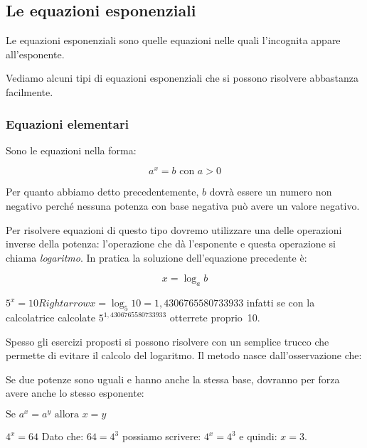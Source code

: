 \subsection{Le equazioni esponenziali}
\label{subsec:esplog_equazioniesponenziali}

\begin{definizione}{
Le equazioni esponenziali
sono quelle equazioni nelle quali l'incognita appare all'esponente.
}
\end{definizione}

Vediamo alcuni tipi di equazioni esponenziali che si possono risolvere 
abbastanza facilmente.

\subsubsection{Equazioni elementari}
\label{subsubsec:esplog_eq_elementari}

Sono le equazioni nella forma:

\[a^x=b \text{ con } a>0\]

Per quanto abbiamo detto precedentemente, \(b\) dovrà essere un numero non 
negativo perché nessuna potenza con base negativa può avere un valore negativo.

Per risolvere equazioni di questo tipo dovremo utilizzare una delle 
operazioni inverse della potenza: l'operazione che dà l'esponente e questa 
operazione si chiama \emph{logaritmo}. 
In pratica la soluzione dell'equazione precedente è:

\[x = \log_a b\]

\begin{esempio}
\(5^x=10 Rightarrow x=\log_5 10 = 1,4306765580733933\)
infatti se con la calcolatrice calcolate \(5^{1,4306765580733933}\) 
otterrete proprio~10.
\end{esempio}

Spesso gli esercizi proposti si possono risolvere con un semplice trucco che 
permette di evitare il calcolo del logaritmo. 
Il metodo nasce dall'osservazione che:

\begin{osservazione}
 Se due potenze sono uguali e hanno anche la stessa base, dovranno per 
forza avere anche lo stesso esponente: 

\(\text{Se } a^x = a^y \text{ allora } x=y\)
\end{osservazione}

\begin{esempio}
\(4^x=64\) Dato che: \(64=4^3\) possiamo scrivere: \(4^x=4^3\) 
e quindi: \(x=3\).
\end{esempio}

